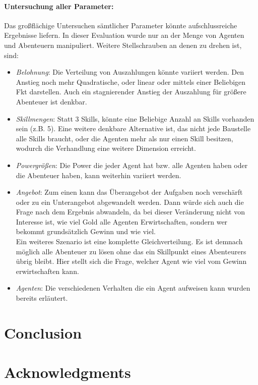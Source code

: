 \documentclass[fleqn,10pt]{article} %
\begin{document}
\paragraph{Untersuchung aller Parameter:}
Das großflächige Untersuchen sämtlicher Parameter könnte aufschlussreiche Ergebnisse liefern. In dieser Evaluation wurde nur an der Menge von Agenten und Abenteuern manipuliert. Weitere Stellschrauben an denen zu drehen ist, sind:
\begin{itemize}
	\item \textit{Belohnung}: Die Verteilung von Auszahlungen könnte variiert werden. Den Anstieg noch mehr Quadratische, oder linear oder mittels einer Beliebigen Fkt darstellen. Auch ein stagnierender Anstieg der Auszahlung für größere Abenteuer ist denkbar.
	\item \textit{Skillmengen}: Statt 3 Skills, könnte eine Beliebige Anzahl an Skills vorhanden sein (z.B. 5). Eine weitere denkbare Alternative ist, das nicht jede Baustelle alle Skills braucht, oder die Agenten mehr als nur einen Skill besitzen, wodurch die Verhandlung eine weitere Dimension erreicht. 
	\item \textit{Powergrößen}: Die Power die jeder Agent hat bzw. alle Agenten haben oder die Abenteuer haben, kann weiterhin variiert werden.
	\item \textit{Angebot}: Zum einen kann das Überangebot der Aufgaben noch verschärft oder zu ein Unterangebot abgewandelt werden. Dann würde sich auch die Frage nach dem Ergebnis abwandeln, da bei dieser Veränderung nicht von Interesse ist, wie viel Gold alle Agenten Erwirtschaften, sondern wer bekommt grundsätzlich Gewinn und wie viel. \\
	Ein weiteres Szenario ist eine komplette Gleichverteilung. Es ist demnach möglich alle Abenteuer zu lösen ohne das ein Skillpunkt eines Abenteurers übrig bleibt. Hier stellt sich die Frage, welcher Agent wie viel vom Gewinn erwirtschaften kann.
	\item \textit{Agenten}: Die verschiedenen Verhalten die ein Agent aufweisen kann wurden bereits erläutert.
\end{itemize}




\section{Conclusion}
\label{sec:Conclusion}

\section*{Acknowledgments} %
\end{document}
